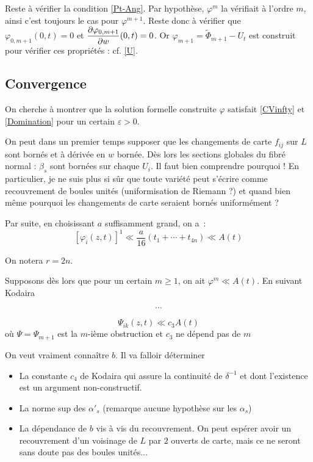 \documentclass[a4paper,11pt,draft,makeidx,twocolumn]{amsart}
\begin{document}
Reste à vérifier la condition \eqref{Pt-Ang}.  Par hypothèse, $\varphi^m$ la vérifiait à l'ordre $m$, ainsi c'est toujours le cas pour $\varphi^{m+1}$. Reste donc à vérifier que $\varphi_{0,m+1}(0,t) = 0$ et $\dfrac{\partial{\varphi_{0,m+1}}}{\partial{w}}(0,t) = 0$. Or $\varphi_{m+1} = \tilde\Phi_{m+1} - U_t$ est construit pour vérifier ces propriétés : cf. \eqref{U}.

\subsection{Convergence}
On cherche à montrer que la solution formelle construite $\varphi$ satisfait \eqref{CVinfty} et \eqref{Domination} pour un certain $\varepsilon>0$.

On peut dans un premier temps supposer que les changements de carte $f_{ij}$ sur $L$ sont bornés et à dérivée en $w$ bornée. Dès lors les sections globales du fibré normal : $\beta_s$ sont bornées sur chaque $U_i$. Il faut bien comprendre pourquoi ! \? En particulier, je ne suis plus si sûr que toute variété peut s'écrire comme recouvrement de boules unités (uniformisation de Riemann ?) et quand bien même pourquoi les changements de carte seraient bornés uniformément ? 

Par suite, en choisissant $a$ suffisamment grand, on a~:
\begin{equation}
\left[\varphi_i(z,t)\right]^1 \ll \dfrac{a}{16}(t_1 + \cdots + t_{4n}) \ll A(t)
\end{equation}

On notera $r = 2n$.

Supposons dès lors que pour un certain $m \geq 1$, on ait $\varphi^m \ll A(t)$. En suivant Kodaira

\[
\cdots
\]

\begin{equation}
\Psi_{ik}(z,t) \ll c_3 A(t)
\end{equation}
où $\Psi =\Psi_{m+1}$ est la $m$-ième obstruction et $c_3$ ne dépend pas de $m$


On veut vraiment connaître $b$. Il va falloir déterminer
\begin{itemize}
\item La constante $c_4$ de Kodaira qui assure la continuité de $\delta^{-1}$ et dont l'existence est un argument non-constructif.
\item La norme sup des $\alpha'_s$ (remarque aucune hypothèse sur les $\alpha_s$)
\item La dépendance de $b$ vis à vis du recouvrement. On peut espérer avoir un recouvrement d'un voisinage de $L$ par $2$ ouverts de carte, mais ce ne seront sans doute pas des boules unités...
\end{itemize}
\end{document}

